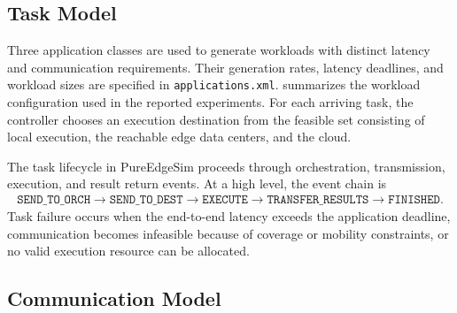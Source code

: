 \subsection{Task Model}
\label{subsec:task-model}

Three application classes are used to generate workloads with distinct latency and communication requirements. Their generation rates, latency deadlines, and workload sizes are specified in \texttt{applications.xml}.  summarizes the workload configuration used in the reported experiments. For each arriving task, the controller chooses an execution destination from the feasible set consisting of local execution, the reachable edge data centers, and the cloud.

\begin{table}[htbp]
    \centering
    \caption{Application workload configuration and result sizes.}
    \label{tab:application-config}
\end{table}

The task lifecycle in PureEdgeSim proceeds through orchestration, transmission, execution, and result return events. At a high level, the event chain is
\begin{align*}
\texttt{SEND\_TO\_ORCH} \rightarrow \texttt{SEND\_TO\_DEST} \rightarrow \texttt{EXECUTE}
\rightarrow \texttt{TRANSFER\_RESULTS} \rightarrow \texttt{FINISHED}.
\end{align*}
Task failure occurs when the end-to-end latency exceeds the application deadline, communication becomes infeasible because of coverage or mobility constraints, or no valid execution resource can be allocated.

\subsection{Communication Model}
\label{subsec:communication-model}

